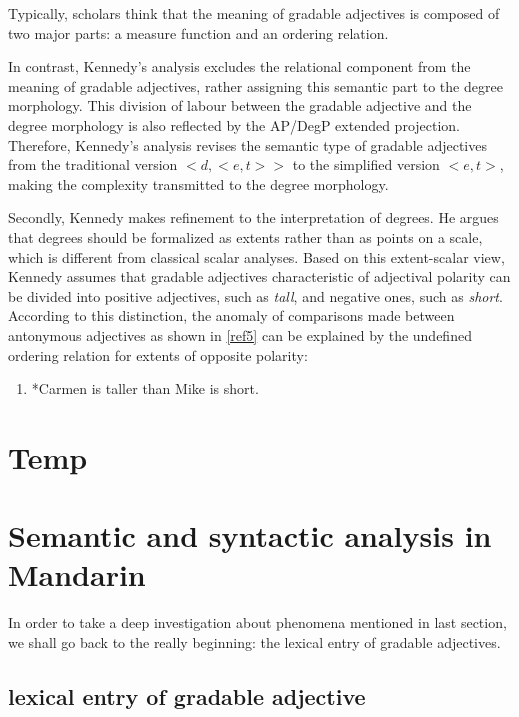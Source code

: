 \documentclass{ctexart}
\let \cite \parencite
\begin{document}
Typically, scholars think that the meaning of gradable adjectives is composed of two major parts: a measure function and an ordering relation\cite{carston2013,horn1992}.

In contrast, Kennedy’s analysis excludes the relational component from the meaning of gradable adjectives, rather assigning this semantic part to the degree morphology. This division of labour between the gradable adjective and the degree morphology is also reflected by the AP/DegP extended projection. Therefore, Kennedy’s analysis revises the semantic type of gradable adjectives from the traditional version $<d,<e,t>>$ to the simplified version $<e,t>$, making the complexity transmitted to the degree morphology.

Secondly, Kennedy makes refinement to the interpretation of degrees. He argues that degrees should be formalized as extents\cite{seuren1978,von1984b,bierwisch1989,lobner2010} rather than as points on a scale, which is different from classical scalar analyses. Based on this extent-scalar view, Kennedy assumes that gradable adjectives characteristic of adjectival polarity can be divided into positive adjectives, such as \textit{tall}, and negative ones, such as \textit{short}. According to this distinction, the anomaly of comparisons made between antonymous adjectives as shown in \ref{ref5} can be explained by the undefined ordering relation for extents of opposite polarity:

\begin{enumerate}[resume]
    \item \label{ref5} *Carmen is taller than Mike is short.
\end{enumerate}

\section{Temp}

\section{Semantic and syntactic analysis in Mandarin}

In order to take a deep investigation about phenomena mentioned in last section, we shall go back to the really beginning: the lexical entry of gradable adjectives. 

\subsection{lexical entry of gradable adjective}
\end{document}

